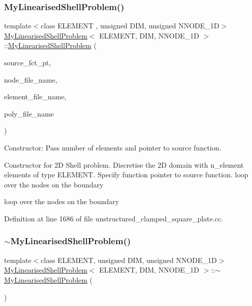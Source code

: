 \subsubsection{\texorpdfstring{My\+Linearised\+Shell\+Problem()}{MyLinearisedShellProblem()}}
{\footnotesize\ttfamily template$<$class E\+L\+E\+M\+E\+NT , unsigned D\+IM, unsigned N\+N\+O\+D\+E\+\_\+1D$>$ \\
\hyperlink{classMyLinearisedShellProblem}{My\+Linearised\+Shell\+Problem}$<$ E\+L\+E\+M\+E\+NT, D\+IM, N\+N\+O\+D\+E\+\_\+1D $>$\+::\hyperlink{classMyLinearisedShellProblem}{My\+Linearised\+Shell\+Problem} (\begin{DoxyParamCaption}\item[{typename \hyperlink{classoomph_1_1MyShellEquations}{My\+Shell\+Equations}$<$ D\+IM, N\+N\+O\+D\+E\+\_\+1D $>$\+::Source\+Fct\+Pt}]{source\+\_\+fct\+\_\+pt,  }\item[{const string \&}]{node\+\_\+file\+\_\+name,  }\item[{const string \&}]{element\+\_\+file\+\_\+name,  }\item[{const string \&}]{poly\+\_\+file\+\_\+name }\end{DoxyParamCaption})}



Constructor\+: Pass number of elements and pointer to source function. 

Constructor for 2D Shell problem. Discretise the 2D domain with n\+\_\+element elements of type E\+L\+E\+M\+E\+NT. Specify function pointer to source function. loop over the nodes on the boundary

loop over the nodes on the boundary 

Definition at line 1686 of file unstructured\+\_\+clamped\+\_\+square\+\_\+plate.\+cc.

\mbox{\label{classMyLinearisedShellProblem_a8720e7226adb9f23266fe729f7e4eb5a}} 
\subsubsection{\texorpdfstring{$\sim$\+My\+Linearised\+Shell\+Problem()}{~MyLinearisedShellProblem()}}
{\footnotesize\ttfamily template$<$class E\+L\+E\+M\+E\+NT, unsigned D\+IM, unsigned N\+N\+O\+D\+E\+\_\+1D$>$ \\
\hyperlink{classMyLinearisedShellProblem}{My\+Linearised\+Shell\+Problem}$<$ E\+L\+E\+M\+E\+NT, D\+IM, N\+N\+O\+D\+E\+\_\+1D $>$\+::$\sim$\hyperlink{classMyLinearisedShellProblem}{My\+Linearised\+Shell\+Problem} (\begin{DoxyParamCaption}{ }\end{DoxyParamCaption})\hspace{0.3cm}{\ttfamily [inline]}}



